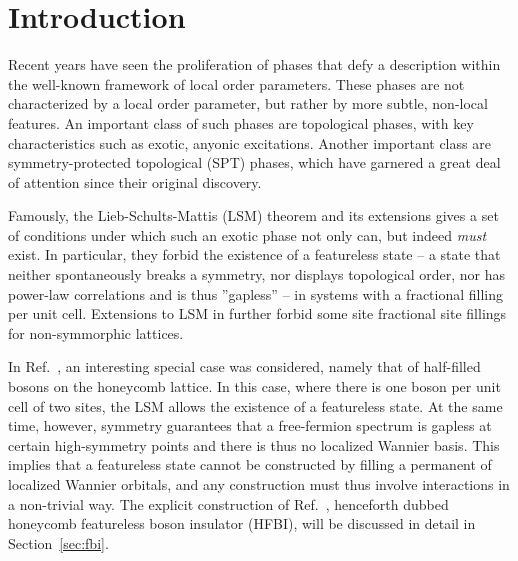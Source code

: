 
\section{Introduction}


Recent years have seen the proliferation of phases that defy a description
within the well-known framework of local order parameters. These phases are
not characterized by a local order parameter, but rather by more subtle,
non-local features. An important class of such phases are topological phases,
with key characteristics such as exotic, anyonic excitations. Another
important class are symmetry-protected topological (SPT) phases, which have
garnered a great deal of attention since their original discovery.

Famously, the Lieb-Schults-Mattis (LSM) theorem and its extensions gives a set of
conditions under which such an exotic phase not only can, but indeed \emph{must}
exist. In particular, they forbid the existence of a featureless state
-- a state that neither spontaneously breaks a symmetry, nor displays topological
order, nor has power-law correlations and is thus ''gapless'' -- in systems
with a fractional filling per unit cell. Extensions to LSM in  further
forbid some site fractional site fillings for non-symmorphic lattices.

In Ref.~, an interesting special case was considered,
namely that of half-filled bosons on the honeycomb lattice. In this case, where
there is one boson per unit cell of two sites, the LSM allows the existence
of a featureless state. At the same time, however, symmetry guarantees that
a free-fermion spectrum is gapless at certain high-symmetry points and there is
thus no localized Wannier basis. This implies that
a featureless state cannot be constructed by filling a permanent
of localized Wannier orbitals, and any construction must thus involve interactions
in a non-trivial way. The explicit construction of Ref.~,
henceforth dubbed honeycomb featureless boson insulator (HFBI),
will be discussed in detail in Section~\ref{sec:fbi}.

